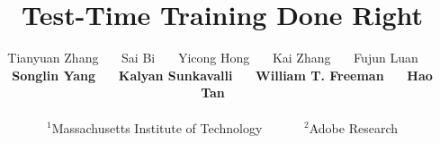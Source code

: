 \documentclass{article}
\title{Test-Time Training Done Right}
\author{%
  Tianyuan Zhang\affmark[1]~~~
  Sai Bi\affmark[2]~~~
  Yicong Hong\affmark[2]~~~
  Kai Zhang\affmark[2]~~~
  Fujun Luan\affmark[2]~~~ \\
  \textbf{Songlin Yang\affmark[1]}~~~
  \textbf{Kalyan Sunkavalli\affmark[2]}~~~
  \textbf{William T. Freeman\affmark[1]}~~~
  \textbf{Hao Tan\affmark[2]}~~~ \\ \\
  $^1$Massachusetts Institute of Technology~~~~~~
    $^2$Adobe Research\\
}
\begin{document}
\maketitle


\maketitle










{\small


}



% 
\end{document}
